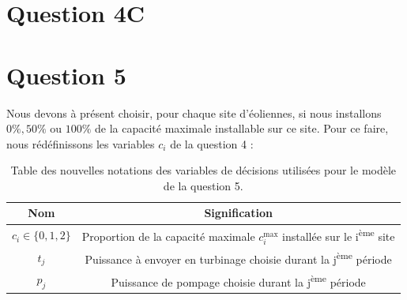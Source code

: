 \documentclass{article}
\begin{document}
\clearpage
\section*{Question 4C}

\newpage
\section*{Question 5}
Nous devons à présent choisir, pour chaque site d'éoliennes, si nous installons $0\%, 50\%$ ou $100\%$ de la capacité maximale installable sur ce site.
Pour ce faire, nous rédéfinissons les variables $c_i$ de la question 4 :

\begin{table}[h!]
    \centering
    \renewcommand{\arraystretch}{1.5}%
    \begin{tabular}{|c || c |} 
        \hline
        Nom & Signification\\
        \hline\hline
        $c_{i} \in \{ 0, 1, 2 \}$ & Proportion de la capacité maximale $c_i^\mathrm{max}$ installée sur le i\textsuperscript{ème} site\\
        $t_j$ & Puissance à envoyer en turbinage choisie durant la j\textsuperscript{ème} période\\
        $p_j$ & Puissance de pompage choisie durant la j\textsuperscript{ème} période\\
        \hline
    \end{tabular}
    \caption{Table des nouvelles notations des variables de décisions utilisées pour le modèle de la question 5.}
    \label{table:notations_variables_5}
\end{table} 
\end{document}

